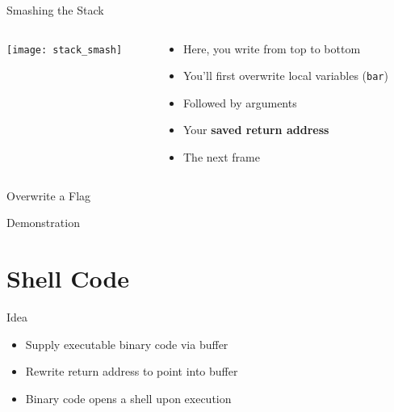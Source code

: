 \documentclass[beamer]{uibk}
\begin{document}
\begin{frame}{Smashing the Stack}
    \begin{columns}
        \begin{column}{0.5\textwidth}
            \begin{center}
                \texttt{[image: stack\_smash]}
            \end{center}
        \end{column}
        \begin{column}{0.5\textwidth}
            \begin{itemize}
                \item Here, you write from top to bottom \bigskip
                \item You'll first overwrite local variables (\texttt{bar}) \bigskip
                \item Followed by arguments \bigskip
                \item Your \textbf{saved return address} \bigskip
                \item The next frame
            \end{itemize}
        \end{column}
    \end{columns}
\end{frame}

\begin{frame}{Overwrite a Flag}
    \begin{center}
        \huge Demonstration
    \end{center}
\end{frame}

\section{Shell Code}

\begin{frame}{Idea}
    \begin{itemize}
        \item Supply executable binary code via buffer
        \medskip
        \item Rewrite return address to point into buffer
        \medskip
        \item Binary code opens a shell upon execution
    \end{itemize}
\end{frame}
\end{document}
